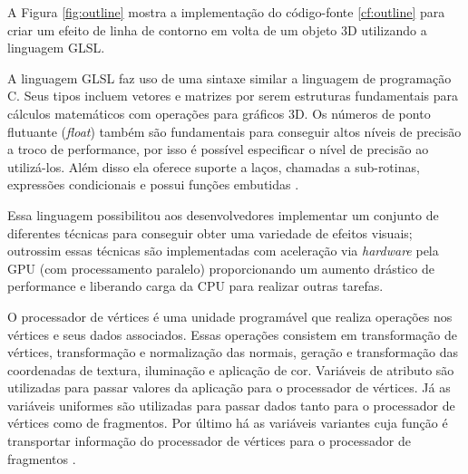 A Figura \ref{fig:outline} mostra a implementação do código-fonte \ref{cf:outline} para criar um efeito de linha de contorno em volta de um objeto 3D utilizando a linguagem GLSL.

\phantom{a}

\phantom{a}

\begin{figure}[h!]
	\centering
\end{figure}

A linguagem GLSL faz uso de uma sintaxe similar a linguagem de programação C. Seus tipos incluem vetores e matrizes por serem estruturas fundamentais para cálculos matemáticos com operações para gráficos 3D. Os números de ponto flutuante (\textit{float}) também são fundamentais para conseguir altos níveis de precisão a troco de performance, por isso é possível especificar o nível de precisão ao utilizá-los. Além disso ela oferece suporte a laços, chamadas a sub-rotinas, expressões condicionais e possui funções embutidas \cite{GLSLBook}. 

Essa linguagem possibilitou aos desenvolvedores implementar um conjunto de diferentes técnicas para conseguir obter uma variedade de efeitos visuais; outrossim essas técnicas são implementadas com aceleração via \textit{hardware} pela GPU (com processamento paralelo) proporcionando um aumento drástico de performance e liberando carga da CPU para realizar outras tarefas.

O processador de vértices é uma unidade programável que realiza operações nos vértices e seus dados associados. Essas operações consistem em transformação de vértices, transformação e normalização das normais, geração e transformação das coordenadas de textura, iluminação e aplicação de cor. Variáveis de atributo são utilizadas para passar valores da aplicação para o processador de vértices. Já as variáveis uniformes são utilizadas para passar dados tanto para o processador de vértices como de fragmentos. Por último há as variáveis variantes cuja função é transportar informação do processador de vértices para o processador de fragmentos \cite{GLSLBook}.

